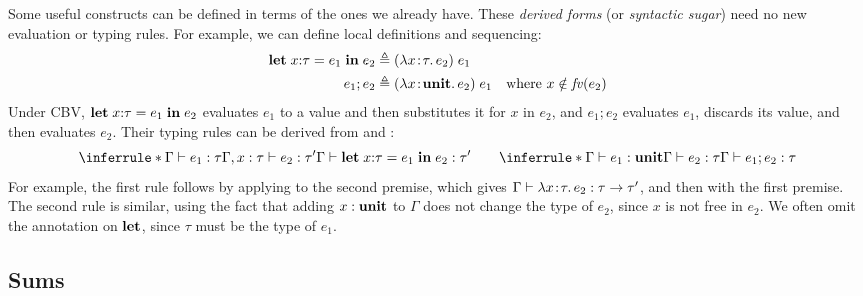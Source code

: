 Some useful constructs can be defined in terms of the ones we already have. These \emph{derived forms} (or \emph{syntactic sugar}) need no new evaluation or typing rules. For example, we can define local definitions and sequencing:
\begin{align*}
\mathbf{let}\; x{:}\tau = e_1\; \mathbf{in}\; e_2 &\triangleq (\lambda x\!:\!\tau.\, e_2)\; e_1 \\
e_1; e_2 &\triangleq (\lambda x\!:\!\mathbf{unit}.\, e_2)\; e_1 \quad \text{where } x \notin \mathit{fv}(e_2)
\end{align*}
Under CBV, $\mathbf{let}\; x{:}\tau = e_1\; \mathbf{in}\; e_2$ evaluates $e_1$ to a value and then substitutes it for $x$ in $e_2$, and $e_1; e_2$ evaluates $e_1$, discards its value, and then evaluates $e_2$. Their typing rules can be derived from  and :
\[
\inferrule*{\Gamma \vdash e_1 : \tau \\ \Gamma, x:\tau \vdash e_2 : \tau'}{\Gamma \vdash \kw{let}\; x{:}\tau = e_1\; \kw{in}\; e_2 : \tau'}
\qquad
\inferrule*{\Gamma \vdash e_1 : \tunit \\ \Gamma \vdash e_2 : \tau}{\Gamma \vdash e_1; e_2 : \tau}
\]
For example, the first rule follows by applying  to the second premise, which gives $\Gamma \vdash \lambda x\!:\!\tau.\, e_2 : \tau \to \tau'$, and then  with the first premise. The second rule is similar, using the fact that adding $x:\mathbf{unit}$ to $\Gamma$ does not change the type of $e_2$, since $x$ is not free in $e_2$. We often omit the annotation on $\mathbf{let}$, since $\tau$ must be the type of $e_1$.

\subsection{Sums}


